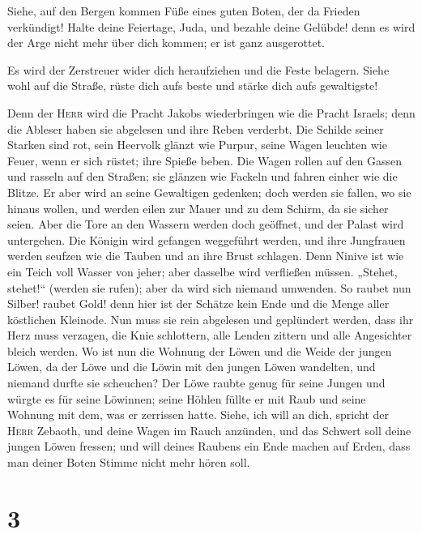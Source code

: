  Siehe, auf den Bergen kommen Füße eines guten Boten, der
da Frieden verkündigt! Halte deine Feiertage, Juda, und bezahle deine
Gelübde! denn es wird der Arge nicht mehr über dich kommen; er ist ganz
ausgerottet.

 Es wird der Zerstreuer wider dich heraufziehen und die
Feste belagern. Siehe wohl auf die Straße, rüste dich aufs beste und
stärke dich aufs gewaltigste!

 Denn der \textsc{Herr} wird die Pracht Jakobs
wiederbringen wie die Pracht Israels; denn die Ableser haben sie
abgelesen und ihre Reben verderbt.  Die Schilde seiner
Starken sind rot, sein Heervolk glänzt wie Purpur, seine Wagen leuchten
wie Feuer, wenn er sich rüstet; ihre Spieße beben.  Die
Wagen rollen auf den Gassen und rasseln auf den Straßen; sie glänzen wie
Fackeln und fahren einher wie die Blitze.  Er aber wird an
seine Gewaltigen gedenken; doch werden sie fallen, wo sie hinaus wollen,
und werden eilen zur Mauer und zu dem Schirm, da sie sicher seien.
 Aber die Tore an den Wassern werden doch geöffnet, und
der Palast wird untergehen.  Die Königin wird gefangen
weggeführt werden, und ihre Jungfrauen werden seufzen wie die Tauben und
an ihre Brust schlagen.  Denn Ninive ist wie ein Teich
voll Wasser von jeher; aber dasselbe wird verfließen müssen. „Stehet,
stehet!{}`` (werden sie rufen); aber da wird sich niemand umwenden.
 So raubet nun Silber! raubet Gold! denn hier ist der
Schätze kein Ende und die Menge aller köstlichen Kleinode.
 Nun muss sie rein abgelesen und geplündert werden, dass
ihr Herz muss verzagen, die Knie schlottern, alle Lenden zittern und
alle Angesichter bleich werden.  Wo ist nun die Wohnung
der Löwen und die Weide der jungen Löwen, da der Löwe und die Löwin mit
den jungen Löwen wandelten, und niemand durfte sie scheuchen?
 Der Löwe raubte genug für seine Jungen und würgte es für
seine Löwinnen; seine Höhlen füllte er mit Raub und seine Wohnung mit
dem, was er zerrissen hatte.  Siehe, ich will an dich,
spricht der \textsc{Herr} Zebaoth, und deine Wagen im Rauch anzünden,
und das Schwert soll deine jungen Löwen fressen; und will deines Raubens
ein Ende machen auf Erden, dass man deiner Boten Stimme nicht mehr hören
soll.

\hypertarget{section-2}{%
\section{3}\label{section-2}}

